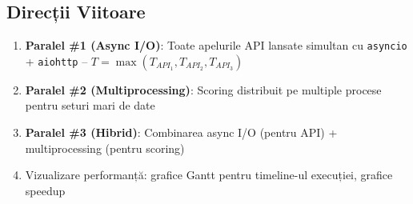 \documentclass[12pt,a4paper]{article}
\begin{document}
\subsection{Direcții Viitoare}

\begin{enumerate}
    \item \textbf{Paralel \#1 (Async I/O)}: Toate apelurile API lansate simultan cu \texttt{asyncio} + \texttt{aiohttp} -- $T = \max(T_{API_1}, T_{API_2}, T_{API_3})$
    \item \textbf{Paralel \#2 (Multiprocessing)}: Scoring distribuit pe multiple procese pentru seturi mari de date
    \item \textbf{Paralel \#3 (Hibrid)}: Combinarea async I/O (pentru API) + multiprocessing (pentru scoring)
    \item Vizualizare performanță: grafice Gantt pentru timeline-ul execuției, grafice speedup
\end{enumerate}
\end{document}
